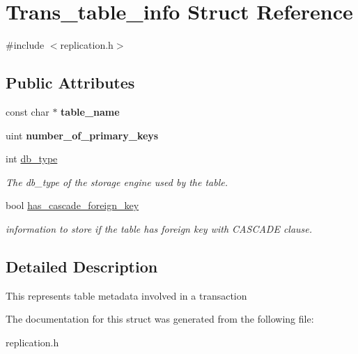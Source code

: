 \hypertarget{structTrans__table__info}{}\section{Trans\+\_\+table\+\_\+info Struct Reference}
\label{structTrans__table__info}


{\ttfamily \#include $<$replication.\+h$>$}

\subsection*{Public Attributes}
\begin{DoxyCompactItemize}
\item 
\mbox{\label{structTrans__table__info_ad15c09d8a3750c82d3a5699b6ffb1795}} 
const char $\ast$ {\bfseries table\+\_\+name}
\item 
\mbox{\label{structTrans__table__info_adfdda9ca275870014c1ba178b9bdfd6b}} 
uint {\bfseries number\+\_\+of\+\_\+primary\+\_\+keys}
\item 
\mbox{\label{structTrans__table__info_a0c4955534332dc2577d64f0fd293bbf6}} 
int \mbox{\hyperlink{structTrans__table__info_a0c4955534332dc2577d64f0fd293bbf6}{db\+\_\+type}}
\begin{DoxyCompactList}\small\item\em The db\+\_\+type of the storage engine used by the table. \end{DoxyCompactList}\item 
\mbox{\label{structTrans__table__info_a608a03e4d7cabac2a8a8ac159030d10a}} 
bool \mbox{\hyperlink{structTrans__table__info_a608a03e4d7cabac2a8a8ac159030d10a}{has\+\_\+cascade\+\_\+foreign\+\_\+key}}
\begin{DoxyCompactList}\small\item\em information to store if the table has foreign key with \textquotesingle{}C\+A\+S\+C\+A\+DE\textquotesingle{} clause. \end{DoxyCompactList}\end{DoxyCompactItemize}


\subsection{Detailed Description}
This represents table metadata involved in a transaction 

The documentation for this struct was generated from the following file\+:\begin{DoxyCompactItemize}
\item 
replication.\+h\end{DoxyCompactItemize}
